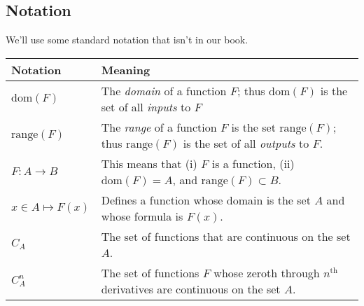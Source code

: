 \documentclass[12pt]{article}
\newcommand{\dom}{\mathrm{dom}}
\newcommand{\range}{\mathrm{range}}
\begin{document}
\subsection*{Notation}

We'll use some standard notation that isn't in our book.   

\vspace{0.1in}

\begin{tabular}{|l | l |} \hline 
\textbf{Notation}& \textbf{Meaning} \\ \hline
    $\dom(F)$  &  The \emph{domain} of a function $F$;   thus $\dom(F)$  is the set of all \emph{inputs} to $F$\\ \hline
    
    $\range(F)$  & The \emph{range} of a function   $F$ is the set $\range(F)$; thus  $\range(F) $ is 
                           the set of all \emph{outputs} to $F$.\\ \hline
                          
   $F : A \to B$ & This means that (i) $F$ is a function, (ii) $\dom(F) = A$, and $\range(F) \subset B$. \\ \hline        
                           
                          
 $ x \in A \mapsto F(x)$  & Defines a function whose domain is the set $A$ and whose formula is $ F(x)$. \\  \hline
 
$  C_A $ &  The set of functions that are continuous on the set $A$. \\  \hline


$ C_A^n$  &  The set of functions $F$ whose zeroth through  
                    $n^{\mbox{th}}$  derivatives are continuous on the set $A$. \\  \hline        
                   

                   
\end{tabular}
\end{document}
